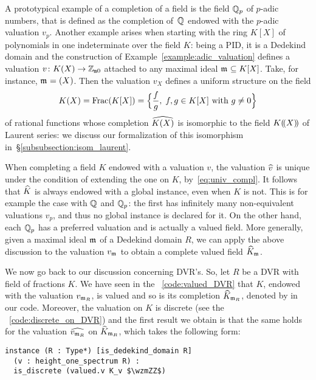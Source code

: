 \documentclass[sigplan,screen]{acmart}
\begin{document}
A prototypical example of a completion of a field is the field $\QQ_p$ of $p$-adic numbers, that is defined as the completion of~$\QQ$ endowed with the $p$-adic valuation $v_p$. Another example arises when starting with the ring $K[X]$ of polynomials in one indeterminate over the field $K$: being a PID, it is a Dedekind domain and the construction of Example~\ref{example:adic_valuation} defines a valuation $v\colon K(X)\to\wzmZZ$ attached to any maximal ideal $\maxid[\empty]\subseteq K[X]$. Take, for instance, $\maxid[\empty]=(X)$. Then the valuation $v_X$ defines a uniform structure on the field
\[
K(X)=\Frac(K[X])=\Bigl\{\frac{f}{g},\; f,g\in K[X]\text{ with }g\ne 0\Bigr\}
\]
of rational functions whose completion $\FpXCompl[K]$ is isomorphic to the field $\laurentseries[K]$ of Laurent series: we discuss our formalization of this isomorphism in~\S\ref{subsubsection:isom_laurent}.

When completing a field $K$ endowed with a valuation $v$, the valuation $\compl{v}$ is unique under the condition of extending the one on $K$, by~\eqref{eq:univ_compl}. It follows that $\compl{K}$ is always endowed with a global  instance, even when $K$ is not. This is for example the case with $\QQ$ and $\QQ_p$: the first has infinitely many non-equivalent valuations $v_p$, and thus no global  instance is declared for it. On the other hand, each $\QQ_p$ has a preferred valuation and is actually a valued field. More generally, given a maximal ideal $\maxid[\empty]$ of a Dedekind domain $R$, we can apply the above discussion to the valuation $v_{\maxid[\empty]}$ to obtain a complete valued field $\compl[{\maxid[\empty]}]{K}$\href{https://leanprover-community.github.io/mathlib_docs/ring_theory/dedekind_domain/adic_valuation.html#is_dedekind_domain.height_one_spectrum.valued_adic_completion}{\extlink}.

We now go back to our discussion concerning DVR's. So, let $R$ be a DVR with field of fractions $K$. We have seen in the \LClistingname~\ref{code:valued_DVR} that $K$, endowed with the valuation $v_{\maxid}$, is valued and so is its completion $\compl[\maxid]{K}$, denoted by  in our code. Moreover, the valuation on $K$ is discrete (see the \LClistingname~\ref{code:discrete_on_DVR}) and the first result we obtain is that the same holds for the valuation $\compl{v_{\maxid}}$ on $\compl[\maxid]{K}$, which takes the following form\href{https://github.com/mariainesdff/local_fields_journal/blob/7ac213eb804fe7945468023527a0fe26ab23b3c8/src/discrete_valuation_ring/complete.lean#L63}{\extlink}:
\begin{lstlisting}
instance (R : Type*) [is_dedekind_domain R]
  (v : height_one_spectrum R) : 
  is_discrete (valued.v K_v $\wzmZZ$)
\end{lstlisting}
\end{document}
